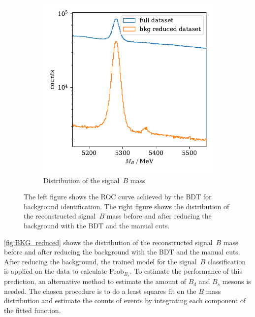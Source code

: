 \begin{figure}
\begin{subfigure}{0.5\textwidth}
        \includegraphics[width=\textwidth]{images/BKG_reduced.pdf}
        \caption{Distribution of the signal~$B$ mass}
        \label{fig:BKG_reduced}
    \end{subfigure}%
    \caption{The left figure shows the ROC curve achieved by the BDT for background identification. The right figure shows the distribution of the reconstructed signal~$B$ mass before and after reducing the background with the BDT and the manual cuts.}
    \label{fig:BKG_eval}
\end{figure}

\autoref{fig:BKG_reduced} shows the distribution of the reconstructed signal~$B$ mass before and after reducing the background with the BDT and the manual cuts.
After reducing the background, the trained model for the signal~$B$ classification is applied on the data to calculate $\text{Prob}_{B_s}$.
To estimate the performance of this prediction, an alternative method to estimate the amount of $B_d$ and $B_s$ mesons is needed.
The chosen procedure is to do a least squares fit on the $B$ mass distribution and estimate the counts of events by integrating each component of the fitted function.

